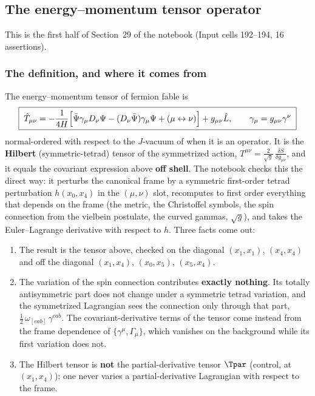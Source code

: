 \subsection{The energy--momentum tensor operator}
\label{sec:3.6}

This is the first half of Section~29 of the notebook (Input cells 192--194, 16 assertions).

\subsubsection{The definition, and where it comes from}
\label{sec:3.6.1}

The energy--momentum tensor of fermion fable is
\[
  \boxed{\;\hat T_{\mu\nu}=-\frac{1}{4H}\Bigl[\bar\Psi\gamma_\mu D_\nu\Psi-(D_\nu\bar\Psi)\gamma_\mu\Psi+(\mu\leftrightarrow\nu)\Bigr]+g_{\mu\nu}\hat L,
  \qquad \gamma_\mu=g_{\mu\nu}\gamma^\nu\;}
\]
normal-ordered with respect to the $J$-vacuum of  when it is an operator. It is the
\textbf{Hilbert} (symmetric-tetrad) tensor of the symmetrized action,
$T^{\mu\nu}=\frac{2}{\sqrt g}\,\frac{\delta S}{\delta g_{\mu\nu}}$, and it equals the covariant
expression above \textbf{off shell}. The notebook checks this the direct way: it perturbs the
canonical frame by a symmetric first-order tetrad perturbation $h(x_0,x_4)$ in the $(\mu,\nu)$ slot,
recomputes to first order everything that depends on the frame (the metric, the Christoffel symbols,
the spin connection from the vielbein postulate, the curved gammas, $\sqrt g$), and takes the
Euler--Lagrange derivative with respect to $h$. Three facts come out:
\begin{enumerate}
  \item The result is the tensor above, checked on the diagonal $(x_1,x_1)$, $(x_4,x_4)$ and off the
        diagonal $(x_1,x_4)$, $(x_0,x_5)$, $(x_5,x_4)$.
  \item The variation of the spin connection contributes \textbf{exactly nothing}. Its totally
        antisymmetric part does not change under a symmetric tetrad variation, and the symmetrized
        Lagrangian sees the connection only through that part, $\tfrac12\,\omega_{[cab]}\,\gamma^{cab}$.
        The covariant-derivative terms of the tensor come instead from the frame dependence of
        $\{\gamma^\mu,\Gamma_\mu\}$, which vanishes on the background while its first variation does
        not.
  \item The Hilbert tensor is \textbf{not} the partial-derivative tensor $\Tpar$ (control, at
        $(x_1,x_4)$): one never varies a partial-derivative Lagrangian with respect to the frame.
\end{enumerate}
